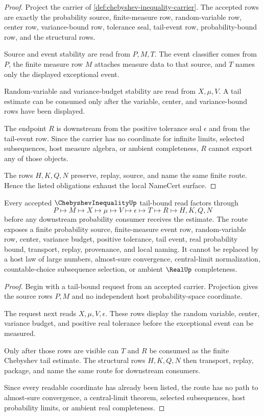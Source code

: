 \begin{proof}
Project the carrier of \autoref{def:chebyshev-inequality-carrier}. The accepted rows are exactly the probability source, finite-measure row, random-variable row, center row, variance-bound row, tolerance seal, tail-event row, probability-bound row, and the structural rows.

Source and event stability are read from $P,M,T$. The event classifier comes from $P$, the finite measure row $M$ attaches measure data to that source, and $T$ names only the displayed exceptional event.

Random-variable and variance-budget stability are read from $X,\mu,V$. A tail estimate can be consumed only after the variable, center, and variance-bound rows have been displayed.

The endpoint $R$ is downstream from the positive tolerance seal $\epsilon$ and from the tail-event row. Since the carrier has no coordinate for infinite limits, selected subsequences, host measure algebra, or ambient completeness, $R$ cannot export any of those objects.

The rows $H,K,Q,N$ preserve, replay, source, and name the same finite route. Hence the listed obligations exhaust the local NameCert surface.
\end{proof}

\begin{theorem}\label{thm:chebyshev-inequality-tail-bound-nonescape}
Every accepted $\ChebyshevInequalityUp$ tail-bound read factors through
$$
P\longmapsto M\longmapsto X\longmapsto \mu\longmapsto V\longmapsto \epsilon\longmapsto T\longmapsto R\longmapsto H,K,Q,N
$$
before any downstream probability consumer receives the estimate. The route exposes a finite probability source, finite-measure event row, random-variable row, center, variance budget, positive tolerance, tail event, real probability bound, transport, replay, provenance, and local naming. It cannot be replaced by a host law of large numbers, almost-sure convergence, central-limit normalization, countable-choice subsequence selection, or ambient $\RealUp$ completeness.
\end{theorem}
\begin{proof}
Begin with a tail-bound request from an accepted carrier. Projection gives the source rows $P,M$ and no independent host probability-space coordinate.

The request next reads $X,\mu,V,\epsilon$. These rows display the random variable, center, variance budget, and positive real tolerance before the exceptional event can be measured.

Only after those rows are visible can $T$ and $R$ be consumed as the finite Chebyshev tail estimate. The structural rows $H,K,Q,N$ then transport, replay, package, and name the same route for downstream consumers.

Since every readable coordinate has already been listed, the route has no path to almost-sure convergence, a central-limit theorem, selected subsequences, host probability limits, or ambient real completeness.
\end{proof}

